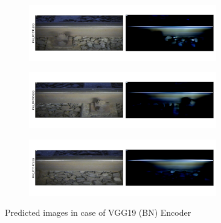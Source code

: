 \begin{figure}[H]
    \centering
    \begin{subfigure}{\textwidth}
        \centering
        \includegraphics[width=0.9\textwidth,trim={0 1cm 0 1cm},clip]{./results/vgg19_bn_vgg19/20230525_045131_predict_0.png}
    \end{subfigure}
    \begin{subfigure}{\textwidth}
        \centering
        \includegraphics[width=0.9\textwidth,trim={0 1cm 0 1cm},clip]{./results/vgg19_bn_vgg19/20230525_045131_predict_1.png}
    \end{subfigure}
    \begin{subfigure}{\textwidth}
        \centering
        \includegraphics[width=0.9\textwidth,trim={0 1cm 0 1cm},clip]{./results/vgg19_bn_vgg19/20230525_045131_predict_2.png}
    \end{subfigure}
    \caption{Predicted images in case of VGG19 (BN) Encoder}
    \label{fig:vgg19_bn_examples}
\end{figure}


